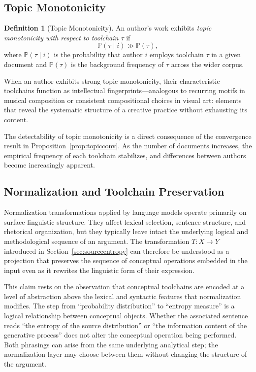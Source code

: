 \documentclass[12pt,a4paper]{article}
\theoremstyle{definition}
\newtheorem{definition}{Definition}[section]
\theoremstyle{plain}
\theoremstyle{remark}
\newcommand{\Prob}{\mathbb{P}}
\begin{document}
\subsection{Topic Monotonicity}

\begin{definition}[Topic Monotonicity]
An author's work exhibits \emph{topic monotonicity with respect to toolchain $\tau$} if
\[
\Prob(\tau \mid i) \gg \Prob(\tau),
\]
where $\Prob(\tau \mid i)$ is the probability that author $i$ employs toolchain $\tau$ in a
given document and $\Prob(\tau)$ is the background frequency of $\tau$ across the wider
corpus.
\end{definition}

When an author exhibits strong topic monotonicity, their characteristic toolchains
function as intellectual fingerprints---analogous to recurring motifs in musical composition
or consistent compositional choices in visual art: elements that reveal the systematic
structure of a creative practice without exhausting its content.

The detectability of topic monotonicity is a direct consequence of the convergence
result in Proposition~\ref{prop:topicconv}. As the number of documents increases, the
empirical frequency of each toolchain stabilizes, and differences between authors become
increasingly apparent.

\subsection{Normalization and Toolchain Preservation}

Normalization transformations applied by language models operate primarily on surface
linguistic structure. They affect lexical selection, sentence structure, and rhetorical
organization, but they typically leave intact the underlying logical and methodological
sequence of an argument. The transformation $T : X \to Y$ introduced in
Section~\ref{sec:sourceentropy} can therefore be understood as a projection that preserves
the sequence of conceptual operations embedded in the input even as it rewrites the linguistic
form of their expression.

This claim rests on the observation that conceptual toolchains are encoded at a level of
abstraction above the lexical and syntactic features that normalization modifies. The step
from ``probability distribution'' to ``entropy measure'' is a logical relationship between
conceptual objects. Whether the associated sentence reads ``the entropy of the source
distribution'' or ``the information content of the generative process'' does not alter the
conceptual operation being performed. Both phrasings can arise from the same underlying
analytical step; the normalization layer may choose between them without changing the
structure of the argument.
\end{document}
